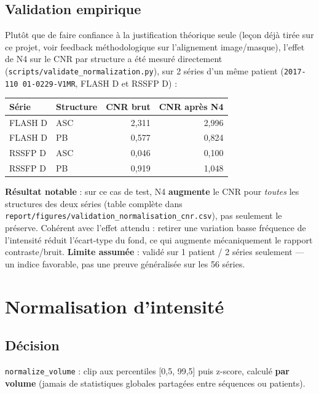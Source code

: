 \subsection{Validation empirique}

Plutôt que de faire confiance à la justification théorique seule (leçon déjà tirée sur
ce projet, voir feedback méthodologique sur l'alignement image/masque), l'effet de N4
sur le CNR par structure a été mesuré directement (\texttt{scripts/validate\_normalization.py}),
sur 2 séries d'un même patient (\texttt{2017-110 01-0229-V1MR}, FLASH D et RSSFP D) :

\begin{center}
\begin{tabular}{llrr}
\toprule
Série & Structure & CNR brut & CNR après N4 \\
\midrule
FLASH D  & ASC  & 2,311 & 2,996 \\
FLASH D  & PB   & 0,577 & 0,824 \\
RSSFP D  & ASC  & 0,046 & 0,100 \\
RSSFP D  & PB   & 0,919 & 1,048 \\
\bottomrule
\end{tabular}
\end{center}

\textbf{Résultat notable} : sur ce cas de test, N4 \textbf{augmente} le CNR pour
\emph{toutes} les structures des deux séries (table complète dans
\texttt{report/figures/validation\_normalisation\_cnr.csv}), pas seulement le préserve.
Cohérent avec l'effet attendu : retirer une variation basse fréquence de l'intensité
réduit l'écart-type du fond, ce qui augmente mécaniquement le rapport contraste/bruit.
\textbf{Limite assumée} : validé sur 1 patient / 2 séries seulement --- un indice
favorable, pas une preuve généralisée sur les 56 séries.

\section{Normalisation d'intensité}
\label{sec:normalisation}

\subsection{Décision}

\texttt{normalize\_volume} : clip aux percentiles [0,5, 99,5] puis z-score, calculé
\textbf{par volume} (jamais de statistiques globales partagées entre séquences ou
patients).

